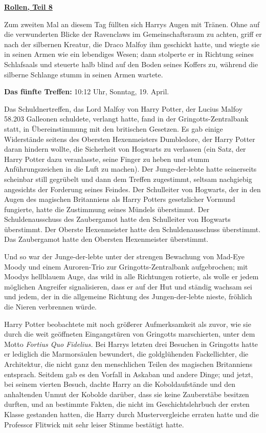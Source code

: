 

\hypertarget{rollen-teil-8}{%

\textbf{\uline{Rollen, Teil 8}}

Zum zweiten Mal an diesem Tag füllten sich Harrys Augen mit Tränen. Ohne auf die verwunderten Blicke der Ravenclaws im Gemeinschaftsraum zu achten, griff er nach der silbernen Kreatur, die Draco Malfoy ihm geschickt hatte, und wiegte sie in seinen Armen wie ein lebendiges Wesen; dann stolperte er in Richtung seines Schlafsaals und steuerte halb blind auf den Boden seines Koffers zu, während die silberne Schlange stumm in seinen Armen wartete.

\textbf{Das fünfte Treffen:} 10:12 Uhr, Sonntag, 19. April.

Das Schuldnertreffen, das Lord Malfoy von Harry Potter, der Lucius Malfoy 58.203 Galleonen schuldete, verlangt hatte, fand in der Gringotts-Zentralbank statt, in Übereinstimmung mit den britischen Gesetzen. Es gab einige Widerstände seitens des Obersten Hexenmeisters Dumbledore, der Harry Potter daran hindern wollte, die Sicherheit von Hogwarts zu verlassen (ein Satz, der Harry Potter dazu veranlasste, seine Finger zu heben und stumm Anführungszeichen in die Luft zu machen). Der Junge-der-lebte hatte seinerseits scheinbar still gegrübelt und dann dem Treffen zugestimmt, seltsam nachgiebig angesichts der Forderung seines Feindes. Der Schulleiter von Hogwarts, der in den Augen des magischen Britanniens als Harry Potters gesetzlicher Vormund fungierte, hatte die Zustimmung seines Mündels überstimmt. Der Schuldenausschuss des Zaubergamot hatte den Schulleiter von Hogwarts überstimmt. Der Oberste Hexenmeister hatte den Schuldenausschuss überstimmt. Das Zaubergamot hatte den Obersten Hexenmeister überstimmt.

Und so war der Junge-der-lebte unter der strengen Bewachung von Mad-Eye Moody und einem Auroren-Trio zur Gringotts-Zentralbank aufgebrochen; mit Moodys hellblauem Auge, das wild in alle Richtungen rotierte, als wolle er jedem möglichen Angreifer signalisieren, dass er auf der Hut und ständig wachsam sei und jedem, der in die allgemeine Richtung des Jungen-der-lebte nieste, fröhlich die Nieren verbrennen würde.

Harry Potter beobachtete mit noch größerer Aufmerksamkeit als zuvor, wie sie durch die weit geöffneten Eingangstüren von Gringotts marschierten, unter dem Motto \emph{Fortius Quo Fidelius.} Bei Harrys letzten drei Besuchen in Gringotts hatte er lediglich die Marmorsäulen bewundert, die goldglühenden Fackellichter, die Architektur, die nicht ganz den menschlichen Teilen des magischen Britanniens entsprach. Seitdem gab es den Vorfall in Askaban und andere Dinge; und jetzt, bei seinem vierten Besuch, dachte Harry an die Koboldaufstände und den anhaltenden Unmut der Kobolde darüber, dass sie keine Zauberstäbe besitzen durften, und an bestimmte Fakten, die nicht im Geschichtslehrbuch der ersten Klasse gestanden hatten, die Harry durch Mustervergleiche erraten hatte und die Professor Flitwick mit sehr leiser Stimme bestätigt hatte.

}
